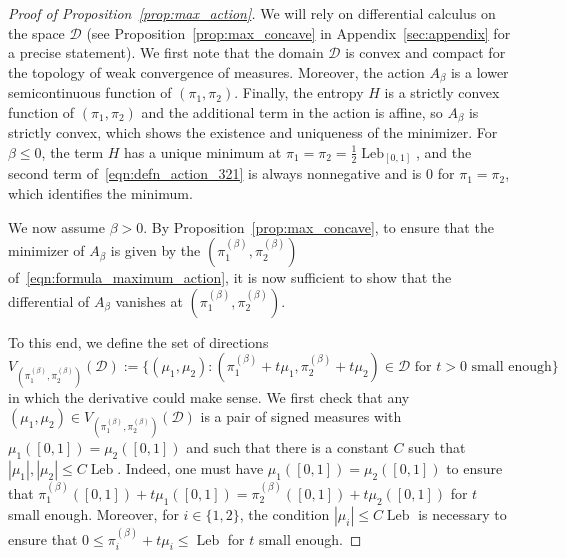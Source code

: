 \documentclass[a4paper,11pt]{amsart}
\DeclareMathOperator{\Leb}{Leb}
\theoremstyle{definition}
\begin{document}
\begin{proof}[Proof of Proposition~\ref{prop:max_action}]
	We will rely on differential calculus on the space $\mathcal{D}$ (see Proposition~\ref{prop:max_concave} in Appendix~\ref{sec:appendix} for a precise statement).
	We first note that the domain $\mathcal{D}$ is convex and compact for the topology of weak convergence of measures. 
	Moreover, the action $A_{\beta}$ is a lower semicontinuous function of $(\pi_1, \pi_2)$. 
	Finally, the entropy $H$ is a strictly convex function of $(\pi_1, \pi_2)$ and the additional term in the action is affine, so $A_{\beta}$ is strictly convex, which shows the existence and uniqueness of the minimizer.
	For $\beta \leq 0$, the term $H$ has a unique minimum at $\pi_1=\pi_2=\frac{1}{2}\Leb_{[0,1]}$, and the second term of~\eqref{eqn:defn_action_321} is always nonnegative and is $0$ for $\pi_1=\pi_2$, which identifies the minimum.
	
	We now assume $\beta>0$. By Proposition~\ref{prop:max_concave}, to ensure that the minimizer of $A_{\beta}$ is given by the $(\pi_1^{(\beta)}, \pi_2^{(\beta)})$ of~\eqref{eqn:formula_maximum_action}, it is now sufficient to show that the differential of $A_{\beta}$ vanishes at $(\pi_1^{(\beta)}, \pi_2^{(\beta)})$.
	
	To this end, we define the set of directions
	\[V_{\left(\pi_1^{(\beta)}, \pi_2^{(\beta)}\right)}(\mathcal{D}):=\big\{(\mu_1, \mu_2):(\pi_1^{(\beta)}+t\mu_1,\pi_2^{(\beta)}+t\mu_2) \in \mathcal D \text{ for $t>0$ small enough}\big\}\]
	in which the derivative could make sense.
	We first check that any $(\mu_1, \mu_2) \in V_{\left(\pi_1^{(\beta)}, \pi_2^{(\beta)}\right)}(\mathcal{D})$ is a pair of signed measures with%
    $\mu_1([0,1])=\mu_2([0,1])$ and such that there is a constant $C$ such that $|\mu_1|,|\mu_2| \leq C \Leb$.	
	Indeed, one must have $\mu_1([0,1])=\mu_2([0,1])$ to ensure that $\pi_1^{(\beta)}([0,1])+t\mu_1([0,1])=\pi_2^{(\beta)}([0,1])+t\mu_2([0,1])$ for $t$ small enough. 
	Moreover, for $i \in \{1,2\}$, the condition $|\mu_i| \leq C \Leb$ is necessary to ensure that $0\le \pi_i^{(\beta)}+t\mu_i \le \Leb$ for $t$ small enough. 


\end{proof}
\end{document}
